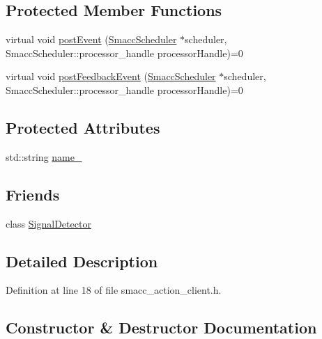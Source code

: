 \subsection*{Protected Member Functions}
\begin{DoxyCompactItemize}
\item 
virtual void \hyperlink{classsmacc_1_1ISmaccActionClient_a5d7d401ab20e1354348848f427a603ed}{post\+Event} (\hyperlink{common_8h_a13d01c0cecec33c3093445edab0a7eb4}{Smacc\+Scheduler} $\ast$scheduler, Smacc\+Scheduler\+::processor\+\_\+handle processor\+Handle)=0
\item 
virtual void \hyperlink{classsmacc_1_1ISmaccActionClient_af3b9ad387577ce3edcf4f0a93cf87599}{post\+Feedback\+Event} (\hyperlink{common_8h_a13d01c0cecec33c3093445edab0a7eb4}{Smacc\+Scheduler} $\ast$scheduler, Smacc\+Scheduler\+::processor\+\_\+handle processor\+Handle)=0
\end{DoxyCompactItemize}
\subsection*{Protected Attributes}
\begin{DoxyCompactItemize}
\item 
std\+::string \hyperlink{classsmacc_1_1ISmaccActionClient_aec84a0169bf40d394207540ad75b364e}{name\+\_\+}
\end{DoxyCompactItemize}
\subsection*{Friends}
\begin{DoxyCompactItemize}
\item 
class \hyperlink{classsmacc_1_1ISmaccActionClient_a9fb9044f83e768849d1b42d9d0d5508e}{Signal\+Detector}
\end{DoxyCompactItemize}


\subsection{Detailed Description}


Definition at line 18 of file smacc\+\_\+action\+\_\+client.\+h.



\subsection{Constructor \& Destructor Documentation}

